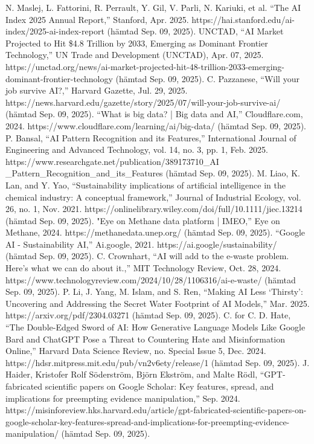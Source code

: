 \documentclass[conference]{IEEEtran}
\begin{document}
\begin{thebibliography}{00}
N. Maslej, L. Fattorini, R. Perrault, Y. Gil, V. Parli, N. Kariuki, et al. “The AI Index 2025 Annual Report,” Stanford, Apr. 2025. https://hai.stanford.edu/ai-index/2025-ai-index-report (hämtad Sep. 09, 2025). 
UNCTAD, “AI Market Projected to Hit \$4.8 Trillion by 2033, Emerging as Dominant Frontier Technology,” UN Trade and Development (UNCTAD), Apr. 07, 2025. https://unctad.org/news/ai-market-projected-hit-48-trillion-2033-emerging-dominant-frontier-technology (hämtad Sep. 09, 2025). 
C. Pazzanese, “Will your job survive AI?,” Harvard Gazette, Jul. 29, 2025. https://news.harvard.edu/gazette/story/2025/07/will-your-job-survive-ai/ (hämtad Sep. 09, 2025). 
“What is big data? | Big data and AI,” Cloudflare.com, 2024. https://www.cloudflare.com/learning/ai/big-data/ (hämtad Sep. 09, 2025). 
P. Bansal, “AI Pattern Recognition and its Features,” International Journal of Engineering and Advanced Technology, vol. 14, no. 3, pp. 1, Feb. 2025. https://www.researchgate.net/publication/389173710\_AI
\_Pattern\_Recognition\_and\_its\_Features (hämtad Sep. 09, 2025). 
M. Liao, K. Lan, and Y. Yao, “Sustainability implications of artificial intelligence in the chemical industry: A conceptual framework,” Journal of Industrial Ecology, vol. 26, no. 1, Nov. 2021. https://onlinelibrary.wiley.com/doi/full/10.1111/jiec.13214 (hämtad Sep. 09, 2025). 
"Eye on Methane data platform | IMEO,” Eye on Methane, 2024. https://methanedata.unep.org/ (hämtad Sep. 09, 2025). 
“Google AI - Sustainability AI,” Ai.google, 2021. https://ai.google/sustainability/ (hämtad Sep. 09, 2025). 
C. Crownhart, “AI will add to the e-waste problem. Here’s what we can do about it.,” MIT Technology Review, Oct. 28, 2024. https://www.technologyreview.com/2024/10/28/1106316/ai-e-waste/ (hämtad Sep. 09, 2025). 
P. Li, J. Yang, M. Islam, and S. Ren, “Making AI Less ‘Thirsty’: Uncovering and Addressing the Secret Water Footprint of AI Models,” Mar. 2025. https://arxiv.org/pdf/2304.03271 (hämtad Sep. 09, 2025). 
C. for C. D. Hate, “The Double-Edged Sword of AI: How Generative Language Models Like Google Bard and ChatGPT Pose a Threat to Countering Hate and Misinformation Online,” Harvard Data Science Review, no. Special Issue 5, Dec. 2024. https://hdsr.mitpress.mit.edu/pub/vn2v6ety/release/1 (hämtad Sep. 09, 2025). 
J. Haider, Kristofer Rolf Söderström, Björn Ekström, and Malte Rödl, “GPT-fabricated scientific papers on Google Scholar: Key features, spread, and implications for preempting evidence manipulation,” Sep. 2024. https://misinforeview.hks.harvard.edu/article/gpt-fabricated-scientific-papers-on-google-scholar-key-features-spread-and-implications-for-preempting-evidence-manipulation/ (hämtad Sep. 09, 2025). 

\end{thebibliography}
\end{document}
